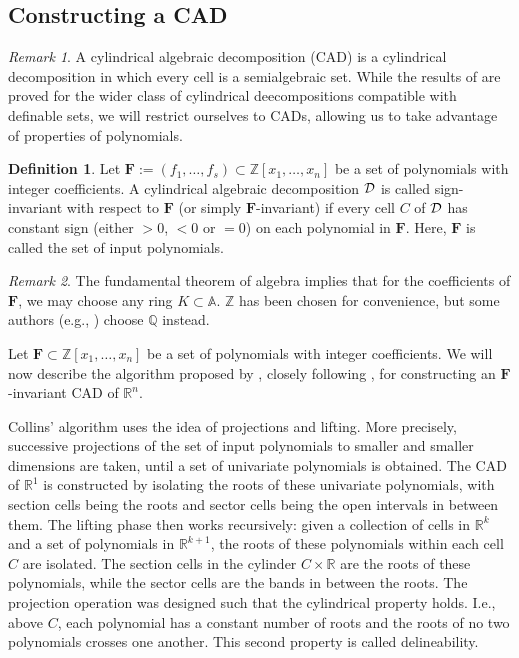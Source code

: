 \documentclass[
]{book}
\theoremstyle{definition}
\newtheorem{definition}{Definition}[chapter]
\theoremstyle{definition}
\theoremstyle{definition}
\theoremstyle{definition}
\theoremstyle{remark}
\newtheorem*{remark}{Remark}
\begin{document}
\hypertarget{sec:cad-construction}{%
\subsection{Constructing a CAD}\label{sec:cad-construction}}

\begin{remark}
A cylindrical algebraic decomposition (CAD) is a cylindrical decomposition in which every cell is a semialgebraic set. While the results of \citet{bgv15} are proved for the wider class of cylindrical deecompositions compatible with definable sets, we will restrict ourselves to CADs, allowing us to take advantage of properties of polynomials.
\end{remark}

\begin{definition}
Let \(\mathbf{F} := (f_1,\ldots,f_s) \subset \mathbb{Z}[x_1,\ldots,x_n]\) be a set of polynomials with integer coefficients. A cylindrical algebraic decomposition \(\cal D\) is called sign-invariant with respect to \(\mathbf{F}\) (or simply \(\mathbf{F}\)-invariant) if every cell \(C\) of \(\cal D\) has constant sign (either \(> 0\), \(< 0\) or \(= 0\)) on each polynomial in \(\mathbf{F}\). Here, \(\mathbf{F}\) is called the set of input polynomials.
\end{definition}

\begin{remark}
The fundamental theorem of algebra implies that for the coefficients of \(\mathbf{F}\), we may choose any ring \(K \subset \mathbb{A}\). \(\mathbb{Z}\) has been chosen for convenience, but some authors (e.g., \citet{pianomovers1983}) choose \(\mathbb{Q}\) instead.
\end{remark}

Let \(\mathbf{F} \subset \mathbb{Z}[x_1,\ldots,x_n]\) be a set of polynomials with integer coefficients. We will now describe the algorithm proposed by \citet{collins1975}, closely following \citet{coste2000}, for constructing an \(\mathbf{F}\)-invariant CAD of \(\mathbb{R}^n\).

Collins' algorithm uses the idea of projections and lifting. More precisely, successive projections of the set of input polynomials to smaller and smaller dimensions are taken, until a set of univariate polynomials is obtained. The CAD of \(\mathbb{R}^1\) is constructed by isolating the roots of these univariate polynomials, with section cells being the roots and sector cells being the open intervals in between them. The lifting phase then works recursively: given a collection of cells in \(\mathbb{R}^k\) and a set of polynomials in \(\mathbb{R}^{k+1}\), the roots of these polynomials within each cell \(C\) are isolated. The section cells in the cylinder \(C \times \mathbb{R}\) are the roots of these polynomials, while the sector cells are the bands in between the roots. The projection operation was designed such that the cylindrical property holds. I.e., above \(C\), each polynomial has a constant number of roots and the roots of no two polynomials crosses one another. This second property is called delineability.
\end{document}
